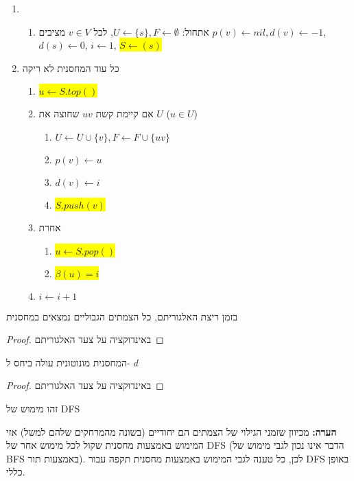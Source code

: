\begin{enumerate}
	\item
\begin{enumerate}
\item
אתחול:
$U \leftarrow \{s\}, F \leftarrow \emptyset$, 
לכל 
$v \in V$
מציבים
$p(v) \leftarrow nil, d(v) \leftarrow -1$,
$d(s) \leftarrow 0$,
$i \leftarrow 1$,
\colorbox{yellow}{$S \leftarrow (s)$}
\end{enumerate}

\item
כל עוד המחסנית לא ריקה
\begin{enumerate}
	\item
	\colorbox{yellow}{$u \leftarrow S.top()$}
	\item 
	אם קיימת קשת 
	$uv$
	שחוצה את $U$ 
	($u \in U$)
		\begin{enumerate}
		\item
		$U \leftarrow U \cup \{v\}, F \leftarrow F \cup \{uv\}$
		\item
		$p(v) \leftarrow u$
		\item
		$d(v) \leftarrow i$
		\item
		\colorbox{yellow}{$S.push(v)$}
		\end{enumerate}
	\item
	אחרת 
	\begin{enumerate}
		\item 
		\colorbox{yellow}{$u \leftarrow S.pop()$}
		\item 
		\colorbox{yellow}{$\beta(u) = i$}
	\end{enumerate}
	\item
	$i \leftarrow i + 1$
	\end{enumerate}
\end{enumerate}

\begin{claim}
בזמן ריצת האלגוריתם, כל הצמתים הגבוליים נמצאים במחסנית
\end{claim}
\begin{proof}
באינדוקציה על צעד האלגוריתם
\end{proof}
\begin{claim}
המחסנית מונוטונית עולה ביחס ל-%
$d$
\end{claim}
\begin{proof}
באינדוקציה על צעד האלגוריתם
\end{proof}

\begin{corollary}
זהו מימוש של DFS
\end{corollary}

\textbf{הערה:}
מכיוון שזמני הגילוי של הצמתים הם יחודיים (בשונה מהמרחקים שלהם למשל) אזי המימוש באמצעות מחסנית
שקול לכל מימוש אחר של DFS (הדבר אינו נכון לגבי מימוש של BFS באמצעות תור).
לכן, כל טענה לגבי המימוש באמצעות מחסנית תקפה עבור DFS באופן כללי.
